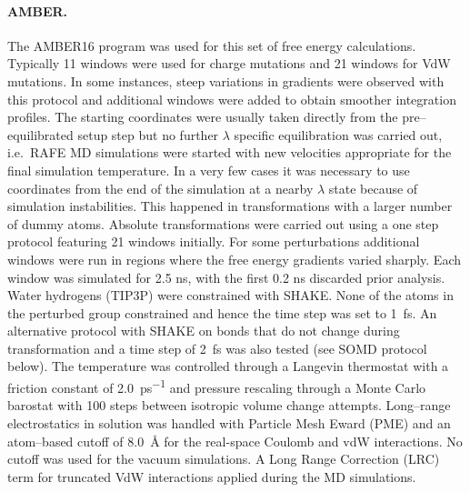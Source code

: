 \documentclass[journal=jctcce,manuscript=article]{achemso}
\providecommand{\DIFadd}[1]{\protect\cbstart{\protect\color{blue}\uwave{#1}}\protect\cbend} %
\providecommand{\DIFdel}[1]{\protect\cbdelete{\protect\color{red}\sout{#1}}\protect\cbdelete} %
\providecommand{\DIFaddbegin}{} %
\providecommand{\DIFaddend}{} %
\providecommand{\DIFdelbegin}{} %
\providecommand{\DIFdelend}{} %
\newcommand{\DIFscaledelfig}{0.5}
\newlength{\DIFdelgraphicswidth} %
\newlength{\DIFdelgraphicsheight} %
\newcommand{\DIFaddincludegraphics}[2][]{{\color{blue}\fbox{\DIFOincludegraphics[#1]{#2}}}} %
\newcommand{\DIFdelincludegraphics}[2][]{%
\sbox{\DIFdelgraphicsbox}{\DIFOincludegraphics[#1]{#2}}%
\settoboxwidth{\DIFdelgraphicswidth}{\DIFdelgraphicsbox} %
\settoboxtotalheight{\DIFdelgraphicsheight}{\DIFdelgraphicsbox} %
\scalebox{\DIFscaledelfig}{%
\parbox[b]{\DIFdelgraphicswidth}{\usebox{\DIFdelgraphicsbox}\\[-\baselineskip] \rule{\DIFdelgraphicswidth}{0em}}\llap{\resizebox{\DIFdelgraphicswidth}{\DIFdelgraphicsheight}{%
\setlength{\unitlength}{\DIFdelgraphicswidth}%
\begin{picture}(1,1)%
\thicklines\linethickness{2pt} %
{\color[rgb]{1,0,0}\put(0,0){\framebox(1,1){}}}%
{\color[rgb]{1,0,0}\put(0,0){\line( 1,1){1}}}%
{\color[rgb]{1,0,0}\put(0,1){\line(1,-1){1}}}%
\end{picture}%
}\hspace*{3pt}}} %
} %
\DeclareRobustCommand{\DIFaddbegin}{\DIFOaddbegin \let\includegraphics\DIFaddincludegraphics} %
\DeclareRobustCommand{\DIFaddend}{\DIFOaddend \let\includegraphics\DIFOincludegraphics} %
\DeclareRobustCommand{\DIFdelbegin}{\DIFOdelbegin \let\includegraphics\DIFdelincludegraphics} %
\DeclareRobustCommand{\DIFdelend}{\DIFOaddend \let\includegraphics\DIFOincludegraphics} %
\begin{document}
%

\paragraph{AMBER.}
The AMBER16 program was used for this set of free energy calculations.
%
Typically 11 windows were used for charge mutations and 21 windows for VdW mutations.
In some instances, steep variations in \DIFaddbegin \DIFadd{TI }\DIFaddend gradients were observed \DIFaddbegin \DIFadd{by visual inspection }\DIFaddend with this protocol and additional windows were added to obtain smoother integration profiles.
The starting coordinates were usually taken directly from the pre--equilibrated setup step but no further $\lambda$ specific equilibration  was carried out,
i.e.\ RAFE MD simulations were started with new velocities appropriate for the final simulation temperature.
In a very few cases it was necessary to use coordinates from the end of the simulation at a nearby $\lambda$ state because of simulation instabilities.
This happened in transformations with a larger number of dummy atoms.
Absolute transformations were carried out using a one step protocol featuring 21 windows initially.
For some perturbations additional windows were run in regions where the free energy gradients varied sharply.
Each window was simulated for 2.5 ns, with the first 0.2 ns discarded prior \DIFaddbegin \DIFadd{to }\DIFaddend analysis.
%
Water hydrogens (TIP3P) were constrained with SHAKE.
None of the atoms in the perturbed group \DIFdelbegin \DIFdel{where }\DIFdelend \DIFaddbegin \DIFadd{were }\DIFaddend constrained and hence the time step was set to \SI{1}{fs}.
An alternative protocol with SHAKE on bonds that do not change during transformation and a time step of \SI{2}{fs} was also tested (see SOMD protocol below).
%
The temperature was controlled through a Langevin thermostat with a friction constant of \SI{2.0}{ps^{-1}} and pressure
rescaling through a Monte Carlo barostat with 100 steps between isotropic volume change attempts.
%
Long--range electrostatics in solution was handled with Particle Mesh Eward (PME) and an atom--based cutoff
of \SI{8.0}{\angstrom} for the real-space Coulomb and vdW interactions.
No cutoff was used for the vacuum simulations.
%
A Long Range Correction (LRC) term for truncated VdW interactions \DIFdelbegin \DIFdel{is }\DIFdelend \DIFaddbegin \DIFadd{was }\DIFaddend applied during the MD simulations.
%
\end{document}
